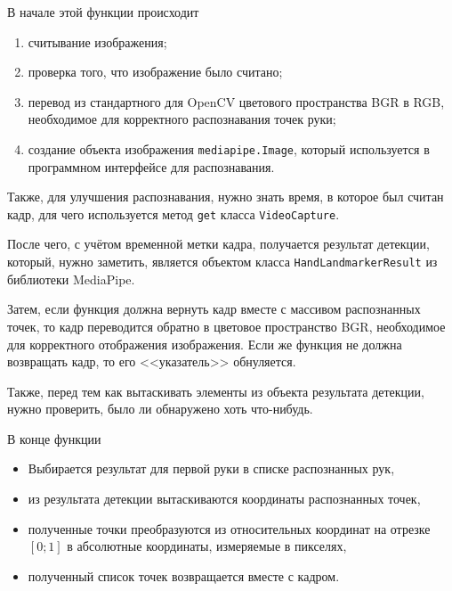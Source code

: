 \documentclass[14pt, a4paper]{extarticle}
\begin{document}
В начале этой функции происходит 
\begin{enumerate}
  \item считывание изображения;
  \item проверка того, что изображение было считано;
  \item перевод из стандартного для OpenCV цветового пространства BGR в RGB,
    необходимое для корректного распознавания точек руки;
  \item создание объекта изображения \texttt{mediapipe.Image}, который
    используется в программном интерфейсе для распознавания.
\end{enumerate}

Также, для улучшения распознавания, нужно знать время, в которое был считан кадр,
для чего используется метод \texttt{get} класса \texttt{VideoCapture}.

После чего, с учётом временной метки кадра, получается результат детекции,
который, нужно заметить, является объектом класса \texttt{HandLandmarkerResult} 
из библиотеки MediaPipe.

Затем, если функция должна вернуть кадр вместе с массивом распознанных точек,
то кадр переводится обратно в цветовое пространство BGR, необходимое для
корректного отображения изображения. Если же функция не должна возвращать
кадр, то его <<указатель>> обнуляется.

Также, перед тем как вытаскивать элементы из объекта результата детекции,
нужно проверить, было ли обнаружено хоть что-нибудь.

В конце функции 
\begin{itemize}
  \item Выбирается результат для первой руки в списке распознанных рук,
  \item из результата детекции вытаскиваются координаты распознанных точек,
  \item полученные точки преобразуются из относительных координат на отрезке
    $\left[0; 1\right]$ в абсолютные координаты, измеряемые в пикселях,
  \item полученный список точек возвращается вместе с кадром.
\end{itemize}
\end{document}
